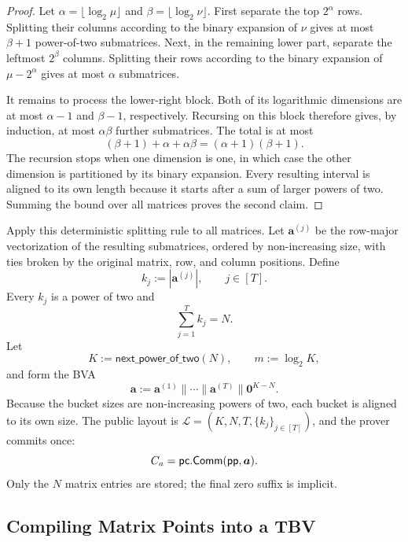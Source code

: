 \begin{proof}
Let $\alpha=\lfloor\log_2\mu\rfloor$ and
$\beta=\lfloor\log_2\nu\rfloor$.  First separate the top $2^\alpha$ rows.
Splitting their columns according to the binary expansion of $\nu$ gives at
most $\beta+1$ power-of-two submatrices.  Next, in the remaining lower part,
separate the leftmost $2^\beta$ columns.  Splitting their rows according to the
binary expansion of $\mu-2^\alpha$ gives at most $\alpha$ submatrices.

It remains to process the lower-right block.  Both of its logarithmic
dimensions are at most $\alpha-1$ and $\beta-1$, respectively.  Recursing on
this block therefore gives, by induction, at most $\alpha\beta$ further
submatrices.  The total is at most
\[
  (\beta+1)+\alpha+\alpha\beta
  =(\alpha+1)(\beta+1).
\]
The recursion stops when one dimension is one, in which case the other
dimension is partitioned by its binary expansion.  Every resulting interval is
aligned to its own length because it starts after a sum of larger powers of
two.  Summing the bound over all matrices proves the second claim.
\end{proof}

Apply this deterministic splitting rule to all matrices.  Let
$\bm a^{(j)}$ be the row-major vectorization of the resulting submatrices,
ordered by non-increasing size, with ties broken by the original matrix,
row, and column positions.  Define
\[
  k_j:=|\bm a^{(j)}|,
  \qquad j\in[T].
\]
Every $k_j$ is a power of two and
\[
    \sum_{j=1}^{T}k_j=N.
\]
Let
\[
  K:=\mathsf{next\_power\_of\_two}(N),
  \qquad
  m:=\log_2K,
\]
and form the BVA
\begin{equation}
\label{eq:matrix-bva}
  \bm a
  :=\bm a^{(1)}\|\cdots\|\bm a^{(T)}\|\bm0^{K-N}.
\end{equation}
Because the bucket sizes are non-increasing powers of two, each bucket is
aligned to its own size.  The public layout is
$\mathcal L=(K,N,T,\{k_j\}_{j\in[T]})$, and the prover commits once:
\begin{equation}
\label{eq:dory-bva-commit}
  C_a={\sf pc}.{\sf Comm}({\sf pp},\bm a).
\end{equation}
Only the $N$ matrix entries are stored; the final zero suffix is implicit.


\subsection{Compiling Matrix Points into a TBV}
\label{sec:point-compilation}

